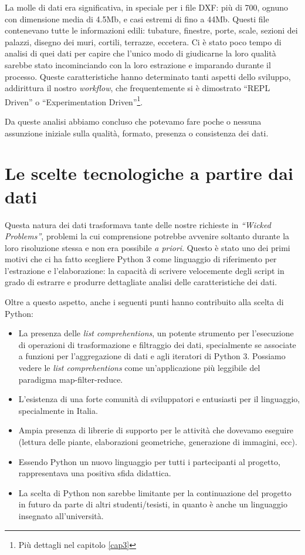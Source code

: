 \documentclass[12pt]{report}
\begin{document}
La molle di dati era significativa, in speciale per i file DXF: più di 700, ognuno con dimensione media di 4.5Mb, e casi estremi di fino a 44Mb. Questi file contenevano tutte le informazioni edili: tubature, finestre, porte, scale, sezioni dei palazzi, disegno dei muri, cortili, terrazze, eccetera. Ci è stato poco tempo di analisi di quei dati per capire che l'unico modo di giudicarne la loro qualità sarebbe stato incominciando con la loro estrazione e imparando durante il processo. Queste caratteristiche hanno determinato tanti aspetti dello sviluppo, addirittura il nostro \textit{workflow}, che frequentemente si è dimostrato ``REPL Driven'' o ``Experimentation Driven''\footnote{Più dettagli nel capitolo \ref{cap3}}. 

Da queste analisi abbiamo concluso che potevamo fare poche o nessuna assunzione iniziale sulla qualità, formato, presenza o consistenza dei dati.

\section{Le scelte tecnologiche a partire dai dati}

Questa natura dei dati trasformava tante delle nostre richieste in \textit{``Wicked Problems''}, problemi la cui comprensione potrebbe avvenire soltanto durante la loro risoluzione stessa e non era possibile \textit{a priori}. Questo è stato uno dei primi motivi che ci ha fatto scegliere Python 3 come linguaggio di riferimento per l'estrazione e l'elaborazione: la capacità di scrivere velocemente degli script in grado di estrarre e produrre dettagliate analisi delle caratteristiche dei dati. 

Oltre a questo aspetto, anche i seguenti punti hanno contribuito alla scelta di Python:
\begin{itemize}
  \item La presenza delle \textit{list comprehentions}, un potente strumento per l'esecuzione di operazioni di trasformazione e filtraggio dei dati, specialmente se associate a funzioni per l'aggregazione di dati e agli iteratori di Python 3. Possiamo vedere le \textit{list comprehentions} come un'applicazione più leggibile del paradigma map-filter-reduce.
  \item L'esistenza di una forte comunità di sviluppatori e entusiasti per il linguaggio, specialmente in Italia.
  \item Ampia presenza di librerie di supporto per le attività che dovevamo eseguire (lettura delle piante, elaborazioni geometriche, generazione di immagini, ecc).
  \item Essendo Python un nuovo linguaggio per tutti i partecipanti al progetto, rappresentava una positiva sfida didattica.
  \item La scelta di Python non sarebbe limitante per la continuazione del progetto in futuro da parte di altri studenti/tesisti, in quanto è anche un linguaggio insegnato all'università.
\end{itemize}
\end{document}

